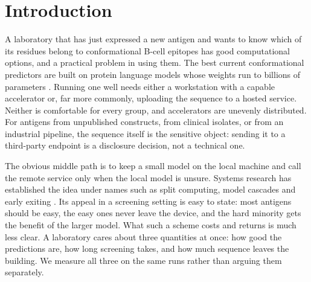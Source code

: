 \section{Introduction}
\label{sec:introduction}

A laboratory that has just expressed a new antigen and wants to know which of
its residues belong to conformational B-cell epitopes has good
computational options, and a practical problem in using them. The best current
conformational predictors are built on protein language models whose weights
run to billions of parameters
\citep{lin2023esm}. Running one well needs either a workstation with a capable
accelerator or, far more commonly, uploading the sequence to a hosted service.
Neither is comfortable for every group, and accelerators are unevenly
distributed.
For antigens from unpublished constructs, from clinical isolates, or from an
industrial pipeline, the sequence itself is the sensitive object: sending it to
a third-party endpoint is a disclosure decision, not a technical one.

The obvious middle path is to keep a small model on the local machine and call
the remote service only when the local model is unsure. Systems research has
established the idea under names such as split computing, model cascades and
early exiting \citep{matsubara2022split}. Its appeal in a screening setting is
easy to state: most antigens should be easy, the easy ones never leave the
device, and the hard minority gets the benefit of the larger model. What such a
scheme costs and returns is much less clear. A laboratory cares about three
quantities at once: how good the predictions are, how long screening takes, and
how much sequence leaves the building. We measure all three on the same runs
rather than arguing them separately.


